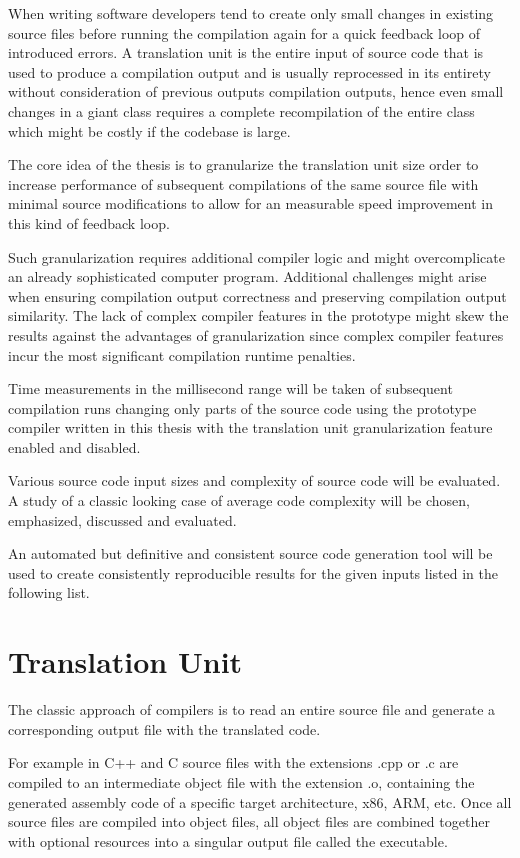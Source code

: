 \documentclass{VUMIFPSbakalaurinis}
\begin{document}
When writing software developers tend to create only small changes in existing source files before running the compilation again for a quick feedback loop of introduced errors.
A translation unit is the entire input of source code that is used to produce a compilation output and is usually reprocessed in its entirety without consideration of previous outputs compilation outputs, hence even small changes in a giant class requires a complete recompilation of the entire class which might be costly if the codebase is large.

The core idea of the thesis is to granularize the translation unit size order to increase performance of subsequent compilations of the same source file with minimal source modifications to allow for an measurable speed improvement in this kind of feedback loop.

Such granularization requires additional compiler logic and might overcomplicate an already sophisticated computer program.
Additional challenges might arise when ensuring compilation output correctness and preserving compilation output similarity.
The lack of complex compiler features in the prototype might skew the results against the advantages of granularization since complex compiler features incur the most significant compilation runtime penalties.

Time measurements in the millisecond range will be taken of subsequent compilation runs changing only parts of the source code using the prototype compiler written in this thesis with the translation unit granularization feature enabled and disabled.

Various source code input sizes and complexity of source code will be evaluated.
A study of a classic looking case of average code complexity will be chosen, emphasized, discussed and evaluated.

An automated but definitive and consistent source code generation tool will be used to create consistently reproducible results for the given inputs listed in the following list.

\section{Translation Unit}
The classic approach of compilers is to read an entire source file and generate a corresponding output file with the translated code.

For example in C++ and C source files with the extensions .cpp or .c are compiled to an intermediate object file with the extension .o, containing the generated assembly code of a specific target architecture, x86, ARM, etc.
Once all source files are compiled into object files, all object files are combined together with optional resources into a singular output file called the executable.
\end{document}
